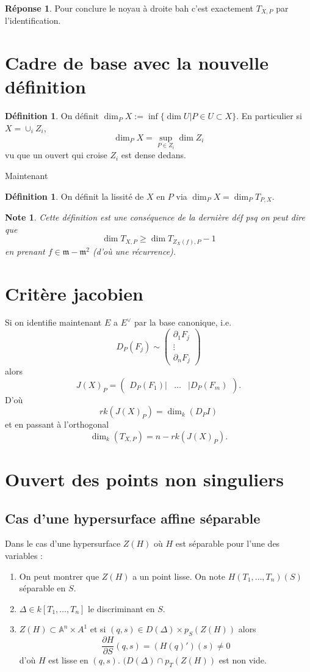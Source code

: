 \documentclass[a4paper,12pt]{book}
\newcommand{\A}{\mathbb{A}}
\newcommand{\m}{\mathfrak{m}}
\theoremstyle{plain}
\newtheorem{note}{Note}
\theoremstyle{definition}
\newtheorem{defn}[subsection]{Définition}
\newtheorem{rep}{Réponse}
\theoremstyle{remark}
\begin{document}
\begin{rep}
    Pour conclure le noyau à droite bah c'est exactement 
    $T_{X,P}$ par l'identification.
\end{rep}

\section{Cadre de base avec la nouvelle définition}
\begin{defn}
    On définit $\dim_P X:=\inf\{\dim U|P\in U\subset X\}$. 
    En particulier si $X=\cup_i Z_i$,
    \[\dim_P X=\sup_{P\in Z_i} \dim Z_i\]
    vu que un ouvert qui croise $Z_i$ est dense dedans.
\end{defn}
Maintenant 
\begin{defn}
    On définit la lissité de $X$ en $P$ via 
    $\dim_P X=\dim_P T_{P,X}$.
\end{defn}
\begin{note}
Cette définition est une conséquence de la dernière déf psq 
on peut dire que 
\[\dim T_{X,P}\geq \dim T_{Z_X(f),P}-1\]
en prenant $f\in \m-\m^2$ (d'où une récurrence).
\end{note}
\section{Critère jacobien}
Si on identifie maintenant $E$ a $E^\vee$ par la base 
canonique, i.e. 
\[D_P(F_j)\sim \begin{pmatrix} \partial_1F_j\\\vdots\\\partial_n F_j\end{pmatrix}\]
alors 
\[J(X)_P=\begin{pmatrix} D_P(F_1)\vert&\ldots&\vert D_P(F_m)\end{pmatrix}.\]
D'où 
\[rk(J(X)_P)=\dim_k(D_PI)\]
et en passant à l'orthogonal
\[\dim_k(T_{X,P})=n-rk(J(X)_P).\]
\section{Ouvert des points non singuliers}
\subsection{Cas d'une hypersurface affine séparable}
Dans le cas d'une hypersurface $Z(H)$ où $H$ est séparable pour
l'une des variables :
\begin{enumerate}
    \item On peut montrer que $Z(H)$ a un point lisse. On note
        $H(T_1,\ldots, T_n)(S)$ séparable en $S$.
    \item $\Delta\in k[T_1,\ldots,T_n]$ le discriminant en $S$.
    \item $Z(H)\subset \A^n\times A^1$ et si $(q,s)\in D(\Delta)
        \times p_S(Z(H))$ alors 
        \[\frac{\partial H}{\partial S}(q,s)=(H(q)')(s)\ne 0\]
        d'où $H$ est lisse en $(q,s)$. $(D(\Delta)\cap p_T(Z(H))$
        est non vide.
\end{enumerate}
\end{document}
